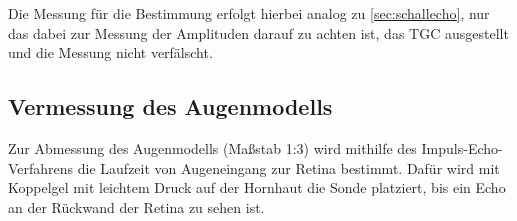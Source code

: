 Die Messung für die Bestimmung erfolgt hierbei analog zu \autoref{sec:schallecho}, 
nur das dabei zur Messung der Amplituden darauf zu achten ist, das TGC ausgestellt und die Messung nicht verfälscht.


\subsection{Vermessung des Augenmodells}

Zur Abmessung des Augenmodells (Maßstab 1:3) wird mithilfe des Impuls-Echo-Verfahrens die Laufzeit von Augeneingang zur Retina bestimmt.
Dafür wird mit Koppelgel mit leichtem Druck auf der Hornhaut die Sonde platziert, bis ein Echo an der Rückwand der Retina zu sehen ist.

